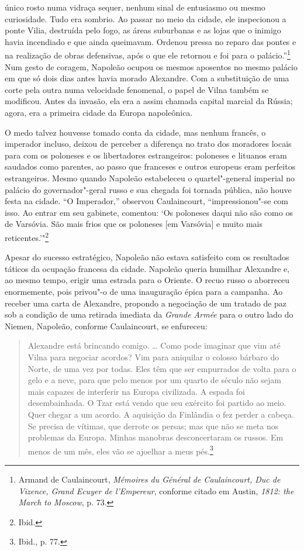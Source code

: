 único rosto numa vidraça sequer, nenhum sinal de entusiasmo ou mesmo
curiosidade. Tudo era sombrio. Ao passar no meio da cidade, ele
inspecionou a ponte Vilia, destruída pelo fogo, as áreas suburbanas e as
lojas que o inimigo havia incendiado e que ainda queimavam. Ordenou
pressa no reparo das pontes e na realização de obras defensivas, após o
que ele retornou e foi para o palácio.''\footnote{Armand de
  Caulaincourt, \emph{Mémoires du Général de Caulaincourt, Duc de
  Vizence, Grand Ecuyer de l'Empereur}, conforme citado em Austin,
  \emph{1812: the March to Moscow}, p. 73.} Num gesto de coragem,
Napoleão ocupou os mesmos aposentos no mesmo palácio em que só dois dias
antes havia morado Alexandre. Com a substituição de uma corte pela outra
numa velocidade fenomenal, o papel de Vilna também se modificou. Antes
da invasão, ela era a assim chamada capital marcial da Rússia; agora,
era a primeira cidade da Europa napoleônica.

O medo talvez houvesse tomado conta da cidade, mas nenhum francês, o
imperador incluso, deixou de perceber a diferença no trato dos moradores
locais para com os poloneses e os libertadores estrangeiros: poloneses e
lituanos eram saudados como parentes, ao passo que franceses e outros
europeus eram perfeitos estrangeiros. Mesmo quando Napoleão estabeleceu
o quartel"-general imperial no palácio do governador"-geral russo e sua
chegada foi tornada pública, não houve festa na cidade. ``O Imperador,''
observou Caulaincourt, ``impressionou"-se com isso. Ao entrar em seu
gabinete, comentou: `Os poloneses daqui não são como os de Varsóvia. São
mais frios que os poloneses {[}em Varsóvia{]} e muito mais
reticentes.'"\footnote{Ibid.}

Apesar do sucesso estratégico, Napoleão não estava satisfeito com os
resultados táticos da ocupação francesa da cidade. Napoleão queria
humilhar Alexandre e, ao mesmo tempo, erigir uma estrada para o Oriente.
O recuo russo o aborreceu enormemente, pois privou"-o de uma inauguração
épica para a campanha. Ao receber uma carta de Alexandre, propondo a
negociação de um tratado de paz sob a condição de uma retirada imediata
da \emph{Grande Armée} para o outro lado do Niemen, Napoleão, conforme
Caulaincourt, se enfureceu:

%

\begin{quote}
Alexandre está brincando comigo. \ldots{} Como pode imaginar que vim até
Vilna para negociar acordos? Vim para aniquilar o colosso bárbaro do
Norte, de uma vez por todas. Eles têm que ser empurrados de volta para o
gelo e a neve, para que pelo menos por um quarto de século não sejam
mais capazes de interferir na Europa civilizada. A espada foi
desembainhada. O Tzar está vendo que seu exército foi partido ao meio.
Quer chegar a um acordo. A aquisição da Finlândia o fez perder a cabeça.
Se precisa de vítimas, que derrote os persas; mas que não se meta nos
problemas da Europa. Minhas manobras desconcertaram os russos. Em menos
de um mês, eles vão se ajoelhar a meus pés.\footnote{Ibid., p. 77.}
\end{quote}

